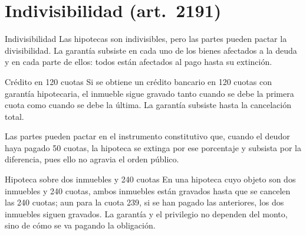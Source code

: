 \documentclass[12pt,oneside]{book}
\begin{document}
\section{Indivisibilidad (art.~2191)}

\begin{definicion}{Indivisibilidad}
Las hipotecas son indivisibles, pero las partes pueden pactar la divisibilidad. La garantía subsiste en cada uno de los bienes afectados a la deuda y en cada parte de ellos: todos están afectados al pago hasta su extinción.
\end{definicion}

\begin{ejemplo}{Crédito en 120 cuotas}
Si se obtiene un crédito bancario en 120 cuotas con garantía hipotecaria, el inmueble sigue gravado tanto cuando se debe la primera cuota como cuando se debe la última. La garantía subsiste hasta la cancelación total.
\end{ejemplo}

Las partes pueden pactar en el instrumento constitutivo que, cuando el deudor haya pagado 50 cuotas, la hipoteca se extinga por ese porcentaje y subsista por la diferencia, pues ello no agravia el orden público.

\begin{ejemplo}{Hipoteca sobre dos inmuebles y 240 cuotas}
En una hipoteca cuyo objeto son dos inmuebles y 240 cuotas, ambos inmuebles están gravados hasta que se cancelen las 240 cuotas; aun para la cuota 239, si se han pagado las anteriores, los dos inmuebles siguen gravados. La garantía y el privilegio no dependen del monto, sino de cómo se va pagando la obligación.
\end{ejemplo}
\end{document}
